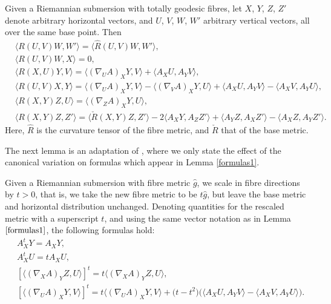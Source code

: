 \begin{Lemma}\label{formulas1}
	Given a Riemannian submersion with totally geodesic fibres, let $X$, $Y$, $Z$, $Z'$ denote arbitrary horizontal vectors, and $U$, $V$, $W$, $W'$ arbitrary vertical vectors, all over the same base point. Then
	\begin{align*}
		&\bigl\langle R(U,V)W,W' \bigr\rangle =\bigl\langle \hat{R}(U,V)W,W' \bigr\rangle, \\
		&\langle R(U,V)W,X \rangle =0, \\
		&\langle R(X,U)Y,V \rangle =\langle (\nabla_U A)_X Y,V \rangle+\langle A_X U, A_Y V\rangle, \\
		&\langle R(U,V)X,Y \rangle =\langle (\nabla_U A)_X Y,V \rangle-\langle (\nabla_V A)_X Y,U\rangle+\langle A_XU,A_YV \rangle-\langle A_XV, A_YU \rangle, \\
		&\langle R(X,Y)Z,U \rangle = \langle (\nabla_ZA)_X Y,U \rangle, \\
		&\bigl\langle R(X,Y)Z,Z' \bigr\rangle =\bigl\langle \check{R}(X,Y)Z,Z' \bigr\rangle-2\bigl\langle A_XY,A_ZZ' \bigr\rangle + \bigl\langle A_Y Z,A_X Z'\bigr\rangle-\bigl\langle A_X Z, A_Y Z'\bigr\rangle.
	\end{align*}
	Here, $\hat{R}$ is the curvature tensor of the fibre metric, and $\check{R}$ that of the base metric.
\end{Lemma}

The next lemma is an adaptation of \cite[Lemma 9.69]{Be}, where we only state the effect of the canonical variation on formulas which appear in Lemma \ref{formulas1}.

\begin{Lemma}\label{formulas2}
	Given a Riemannian submersion with fibre metric $\hat{g}$, we scale in fibre directions by $t>0$, that is, we take the new fibre metric to be $t\hat{g}$, but leave the base metric and horizontal distribution unchanged. Denoting quantities for the rescaled metric with a superscript $t$, and using the same vector notation as in Lemma~$\ref{formulas1}$, the following formulas hold:
	\begin{align*}
		&A^t_X Y=A_XY, \\
		&A^t_X U=tA_XU, \\
		&[\langle (\nabla_X A)_YZ,U\rangle]^t=t\langle (\nabla_XA)_Y Z,U\rangle, \\
		&[\langle (\nabla_UA)_X Y,V\rangle]^t=t\langle (\nabla_U A)_X Y,V \rangle+\bigl(t-t^2\bigr)\bigl(\langle A_XU,A_YV\rangle-\langle A_XV,A_YU\rangle\bigr).
	\end{align*}
\end{Lemma}

